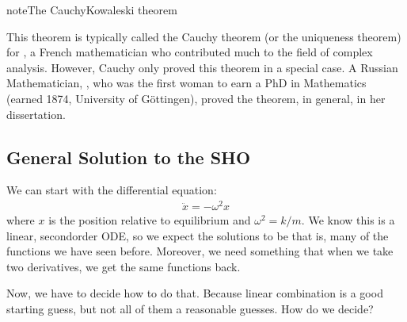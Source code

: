 \documentclass[letterpaper,10pt,english]{jupyterBook}
\begin{document}
\begin{sphinxadmonition}{note}{The Cauchy\sphinxhyphen{}Kowaleski theorem}

\sphinxAtStartPar
This theorem is typically called the Cauchy theorem (or the uniqueness theorem) for , a French mathematician who contributed much to the field of complex analysis. However, Cauchy only proved this theorem in a special case.  A Russian Mathematician, , who was the first woman to earn a PhD in Mathematics (earned 1874, University of Göttingen), proved the theorem, in general, in her dissertation.

\sphinxAtStartPar
{}
\end{sphinxadmonition}


\subsection{General Solution to the SHO}
\label{\detokenize{content/1_mechanics/sho/notes-SHO:general-solution-to-the-sho}}
\sphinxAtStartPar
We can start with the differential equation:
\begin{equation*}
\begin{split}\ddot{x} = -\omega^2 x\end{split}
\end{equation*}
\sphinxAtStartPar
where \(x\) is the position relative to equilibrium and \(\omega^2 = k/m\). We know this is a linear, second\sphinxhyphen{}order ODE, so we expect the solutions to be  \sphinxhyphen{} that is, many of the functions we have seen before. Moreover, we need something that when we take two derivatives, we get the same functions back.

\sphinxAtStartPar
{}

\sphinxAtStartPar
Now, we have to decide how to do that. Because  linear combination is a good starting guess, but not all of them a reasonable guesses. How do we decide?
\end{document}
